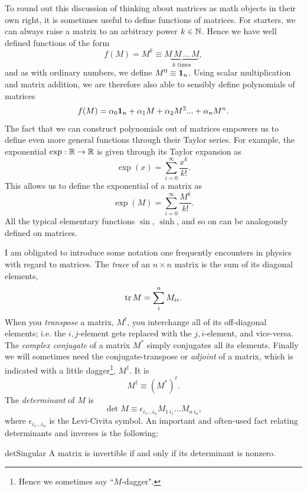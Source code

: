 To round out this discussion of thinking about matrices as math objects in their
own right, it is sometimes useful to define functions of matrices.
For starters, we can always
raise a matrix to an arbitrary power $k\in\mathbb{N}$. Hence we have well defined
functions of the form
\begin{equation}
f(M)=M^k\equiv\underbrace{M\,M\,...\,M}_{k\text{ times}},
\end{equation}
and as with ordinary numbers, we define $M^0\equiv {\mathbf 1}_n$.
Using scalar multiplication and matrix addition, we are therefore also
able to sensibly define polynomials of matrices
\begin{equation}
f(M)=\alpha_0{\mathbf 1}_n + \alpha_1 M + \alpha_2 M^2...+\alpha_n M^n.
\end{equation}
The fact that we can construct polynomials out of matrices empowers us
to define even more general functions through their Taylor series.
For example, the exponential $\exp:\mathbb{R}\to\mathbb{R}$ is given through its Taylor expansion
as
\begin{equation}
\exp(x)=\sum_{i=0}^\infty \frac{x^k}{k!}.
\end{equation}
This allows us to define the exponential of a matrix as
\begin{equation}\label{eq:expMat}
\exp(M)=\sum_{i=0}^\infty \frac{M^k}{k!}.
\end{equation}
All the typical elementary functions $\sin$, $\sinh$, and so on can be
analogously defined on matrices.


I am obligated to introduce some notation one frequently encounters
in physics with regard to matrices. The {\it trace} of an
$n\times n$ matrix is the sum of its diagonal elements,
\begin{equation}
  \tr M=\sum_i^nM_{ii}.
\end{equation}
When you {\it transpose} a matrix, $M^t$, you interchange all of its
off-diagonal elements; i.e. the $i,j$-element gets replaced with the
$j,i$-element, and vice-versa.
The {\it complex conjugate}
of a matrix $M^*$ simply conjugates all its elements.
Finally we will sometimes need the conjugate-transpose or
{\it adjoint} of a matrix, which is indicated with a
little dagger\footnote{Hence we sometimes say ``$M$-dagger".},
$M^\dagger$. It is
\begin{equation}
M^\dagger\equiv (M^*)^t.
\end{equation}
The {\it determinant}
of $M$ is 
\begin{equation}
  \det M\equiv\epsilon_{i_1...i_n}M_{1\,i_1}...M_{n\,i_n},
\end{equation}
where $\epsilon_{i_1...i_n}$ is the Levi-Civita symbol.
An important and often-used fact relating determinants
and inverses is the following:
\begin{proposition}{}{detSingular}
A matrix is invertible if and only if its determinant is nonzero.
\end{proposition}


